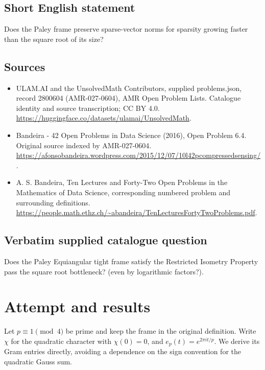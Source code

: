 \documentclass[11pt]{article}
\begin{document}
\subsection{Short English statement}
Does the Paley frame preserve sparse-vector norms for sparsity growing faster than the square root of its size?
\subsection{Sources}
\begin{itemize}
\item[S1] ULAM.AI and the UnsolvedMath Contributors, supplied problems.json, record 2800604 (AMR-027-0604), AMR Open Problem Lists. Catalogue identity and source transcription; CC BY 4.0.
\url{https://huggingface.co/datasets/ulamai/UnsolvedMath}.
\item[S2] Bandeira - 42 Open Problems in Data Science (2016), Open Problem 6.4. Original source indexed by AMR-027-0604.
\url{https://afonsobandeira.wordpress.com/2015/12/07/10l42pcompressedsensing/}.
\item[S3] A. S. Bandeira, Ten Lectures and Forty-Two Open Problems in the Mathematics of Data Science, corresponding numbered problem and surrounding definitions.
\url{https://people.math.ethz.ch/~abandeira/TenLecturesFortyTwoProblems.pdf}.
\end{itemize}
\subsection{Verbatim supplied catalogue question}
Does the Paley Equiangular tight frame satisfy the Restricted Isometry Property pass the square root bottleneck? (even by logarithmic factors?).

\section{Attempt and results}
Let $p\equiv1\pmod4$ be prime and keep the frame in the original definition.
Write $\chi$ for the quadratic character with $\chi(0)=0$, and
$e_p(t)=e^{2\pi it/p}$. We derive its Gram entries directly, avoiding a
dependence on the sign convention for the quadratic Gauss sum.
\end{document}
